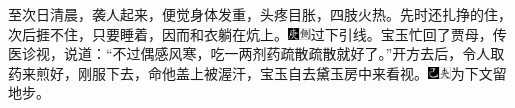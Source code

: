 至次日清晨，袭人起来，便觉身体发重，头疼目胀，四肢火热。先时还扎挣的住，次后捱不住，只要睡着，因而和衣躺在炕上。{\includegraphics[width=3mm]{../Images/00004}\includegraphics[width=3mm]{../Images/00011}\footnotesize \kaishu 过下引线。}宝玉忙回了贾母，传医诊视，说道：``不过偶感风寒，吃一两剂药疏散疏散就好了。''开方去后，令人取药来煎好，刚服下去，命他盖上被渥汗，宝玉自去黛玉房中来看视。{\includegraphics[width=3mm]{../Images/00003}\includegraphics[width=3mm]{../Images/00012}\footnotesize \kaishu 为下文留地步。}

